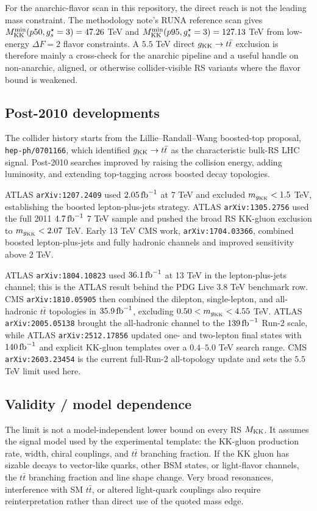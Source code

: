 For the anarchic-flavor scan in this repository, the direct reach is not the
leading mass constraint.  The methodology note's RUNA reference scan gives
\(M_{\mathrm{KK}}^{\min}(p50,g_s^{\star}=3)=47.26\) TeV and
\(M_{\mathrm{KK}}^{\min}(p95,g_s^{\star}=3)=127.13\) TeV from low-energy \(\Delta F=2\) flavor
constraints.  A \(5.5\) TeV direct \(g_{\rm KK}\to t\bar t\) exclusion is
therefore mainly a cross-check for the anarchic pipeline and a useful handle on
non-anarchic, aligned, or otherwise collider-visible RS variants where the
flavor bound is weakened.

\subsection*{Post-2010 developments}
The collider history starts from the Lillie--Randall--Wang boosted-top
proposal, \texttt{hep-ph/0701166}, which identified \(g_{\rm KK}\to t\bar t\)
as the characteristic bulk-RS LHC signal.  Post-2010 searches improved by
raising the collision energy, adding luminosity, and extending top-tagging
across boosted decay topologies.

ATLAS \texttt{arXiv:1207.2409} used \(2.05\,{\rm fb}^{-1}\) at 7 TeV and
excluded \(m_{g_{\rm KK}}<1.5\) TeV, establishing the boosted lepton-plus-jets
strategy.  ATLAS \texttt{arXiv:1305.2756} used the full 2011
\(4.7\,{\rm fb}^{-1}\) 7 TeV sample and pushed the broad RS KK-gluon exclusion
to \(m_{g_{\rm KK}}<2.07\) TeV.  Early 13 TeV CMS work,
\texttt{arXiv:1704.03366}, combined boosted lepton-plus-jets and fully
hadronic channels and improved sensitivity above 2 TeV.

ATLAS \texttt{arXiv:1804.10823} used \(36.1\,{\rm fb}^{-1}\) at 13 TeV in the
lepton-plus-jets channel; this is the ATLAS result behind the PDG Live
\(3.8\) TeV benchmark row.  CMS \texttt{arXiv:1810.05905} then combined the
dilepton, single-lepton, and all-hadronic \(t\bar t\) topologies in
\(35.9\,{\rm fb}^{-1}\), excluding \(0.50<m_{g_{\rm KK}}<4.55\) TeV.  ATLAS
\texttt{arXiv:2005.05138} brought the all-hadronic channel to the
\(139\,{\rm fb}^{-1}\) Run-2 scale, while ATLAS \texttt{arXiv:2512.17856}
updated one- and two-lepton final states with \(140\,{\rm fb}^{-1}\) and
explicit KK-gluon templates over a \(0.4\)--\(5.0\) TeV search range.  CMS
\texttt{arXiv:2603.23454} is the current full-Run-2 all-topology update and
sets the \(5.5\) TeV limit used here.

\subsection*{Validity / model dependence}
The limit is not a model-independent lower bound on every RS \(M_{\rm KK}\).
It assumes the signal model used by the experimental template: the KK-gluon
production rate, width, chiral couplings, and \(t\bar t\) branching fraction.
If the KK gluon has sizable decays to vector-like quarks, other BSM states, or
light-flavor channels, the \(t\bar t\) branching fraction and line shape change.
Very broad resonances, interference with SM \(t\bar t\), or altered light-quark
couplings also require reinterpretation rather than direct use of the quoted
mass edge.

